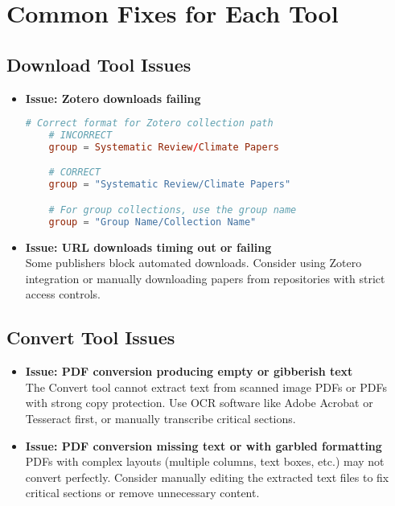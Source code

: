 \section{Common Fixes for Each Tool}

\subsection{Download Tool Issues}

\begin{itemize}
    \item \textbf{Issue: Zotero downloads failing}

    \begin{configbox}
    \begin{lstlisting}[language=TOML]
    # Correct format for Zotero collection path
    # INCORRECT
    group = Systematic Review/Climate Papers

    # CORRECT
    group = "Systematic Review/Climate Papers"

    # For group collections, use the group name
    group = "Group Name/Collection Name"
    \end{lstlisting}
    \end{configbox}

    \item \textbf{Issue: URL downloads timing out or failing}
    \\
    Some publishers block automated downloads. Consider using Zotero integration or manually downloading papers from repositories with strict access controls.
\end{itemize}

\subsection{Convert Tool Issues}

\begin{itemize}
    \item \textbf{Issue: PDF conversion producing empty or gibberish text}
    \\
    The Convert tool cannot extract text from scanned image PDFs or PDFs with strong copy protection. Use OCR software like Adobe Acrobat or Tesseract first, or manually transcribe critical sections.

    \item \textbf{Issue: PDF conversion missing text or with garbled formatting}
    \\
    PDFs with complex layouts (multiple columns, text boxes, etc.) may not convert perfectly. Consider manually editing the extracted text files to fix critical sections or remove unnecessary content.
\end{itemize}

